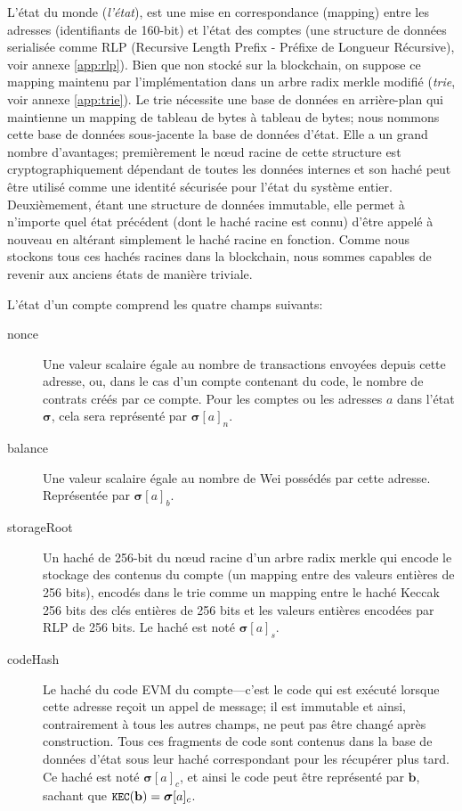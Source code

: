 \documentclass[9pt,oneside]{amsart}
\begin{document}
\begin{multicols}{2}
L'état du monde (\textit{l'état}), est une mise en correspondance (mapping) entre les adresses (identifiants de 160-bit) et l'état des comptes (une structure de données serialisée comme RLP (Recursive Length Prefix - Préfixe de Longueur Récursive), voir annexe \ref{app:rlp}). Bien que non stocké sur la blockchain, on suppose ce mapping maintenu par l'implémentation dans un arbre radix merkle modifié (\textit{trie}, voir annexe \ref{app:trie}). Le trie nécessite une base de données en arrière-plan qui maintienne un mapping de tableau de bytes à tableau de bytes; nous nommons cette base de données sous-jacente la base de données d'état. Elle a un grand nombre d'avantages; premièrement le n\oe{}ud racine de cette structure est cryptographiquement dépendant de toutes les données internes et son haché peut être utilisé comme une identité sécurisée pour l'état du système entier. Deuxièmement, étant une structure de données immutable, elle permet à n'importe quel état précédent (dont le haché racine est connu) d’être appelé à nouveau en altérant simplement le haché racine en fonction. Comme nous stockons tous ces hachés racines dans la blockchain, nous sommes capables de revenir aux anciens états de manière triviale.

L'état d'un compte comprend les quatre champs suivants:	

\begin{description}
\item[nonce] Une valeur scalaire égale au nombre de transactions envoyées depuis cette adresse, ou, dans le cas d'un compte contenant du code, le nombre de contrats créés par ce compte. Pour les comptes ou les adresses $a$ dans l'état $\boldsymbol{\sigma}$, cela sera représenté par $\boldsymbol{\sigma}[a]_n$.
\item[balance] Une valeur scalaire égale au nombre de Wei possédés par cette adresse. Représentée par $\boldsymbol{\sigma}[a]_b$.
\item[storageRoot] Un haché de 256-bit du n\oe{}ud racine d'un arbre radix merkle qui encode le stockage des contenus du compte (un mapping entre des valeurs entières de 256 bits), encodés dans le trie comme un mapping entre le haché Keccak 256 bits des clés entières de 256 bits et les valeurs entières encodées par RLP de 256 bits. Le haché est noté $\boldsymbol{\sigma}[a]_s$.
\item[codeHash] Le haché du code EVM du compte---c'est le code qui est exécuté lorsque cette adresse reçoit un appel de message; il est immutable et ainsi, contrairement à tous les autres champs, ne peut pas être changé après construction. Tous ces fragments de code sont contenus dans la base de données d'état sous leur haché correspondant pour les récupérer plus tard. Ce haché est noté $\boldsymbol{\sigma}[a]_c$, et ainsi le code peut être représenté par $\mathbf{b}$, sachant que $\texttt{\small KEC}(\mathbf{b}) = \boldsymbol{\sigma}[a]_c$.
\end{description}


\end{multicols}
\end{document}
